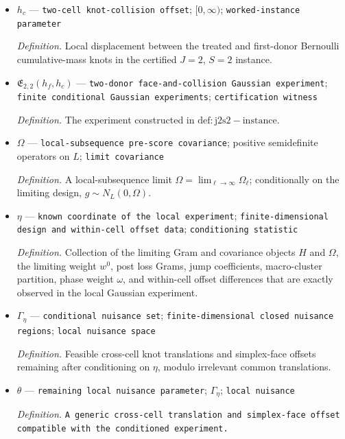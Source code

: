 \documentclass{article}
\begin{document}
\begin{itemize}
  \item \(h_c\) --- \texttt{two-\allowbreak{}cell knot-\allowbreak{}collision offset}; \([0,\infty)\); \texttt{worked-\allowbreak{}instance parameter}
  \par\smallskip\noindent\emph{Definition.} Local displacement between the treated and first-donor Bernoulli cumulative-mass knots in the certified \(J=2\), \(S=2\) instance.
  \item \(\mathfrak E_{2,2}(h_f,h_c)\) --- \texttt{two-\allowbreak{}donor face-\allowbreak{}and-\allowbreak{}collision Gaussian experiment}; \texttt{finite conditional Gaussian experiments}; \texttt{certification witness}
  \par\smallskip\noindent\emph{Definition.} The experiment constructed in \(\mathrm{def:j2s2-instance}\).
  \item \(\Omega\) --- \texttt{local-\allowbreak{}subsequence pre-\allowbreak{}score covariance}; positive semidefinite operators on \(L\); \texttt{limit covariance}
  \par\smallskip\noindent\emph{Definition.} A local-subsequence limit \(\Omega=\lim_{\ell\to\infty}\Omega_\ell\); conditionally on the limiting design, \(g\sim N_L(0,\Omega)\).
  \item \(\eta\) --- \texttt{known coordinate of the local experiment}; \texttt{finite-\allowbreak{}dimensional design and within-\allowbreak{}cell offset data}; \texttt{conditioning statistic}
  \par\smallskip\noindent\emph{Definition.} Collection of the limiting Gram and covariance objects \(H\) and \(\Omega\), the limiting weight \(w^0\), post loss Grams, jump coefficients, macro-cluster partition, phase weight \(\omega\), and within-cell offset differences that are exactly observed in the local Gaussian experiment.
  \item \(\Gamma_\eta\) --- \texttt{conditional nuisance set}; \texttt{finite-\allowbreak{}dimensional closed nuisance regions}; \texttt{local nuisance space}
  \par\smallskip\noindent\emph{Definition.} Feasible cross-cell knot translations and simplex-face offsets remaining after conditioning on \(\eta\), modulo irrelevant common translations.
  \item \(\theta\) --- \texttt{remaining local nuisance parameter}; \(\Gamma_\eta\); \texttt{local nuisance}
  \par\smallskip\noindent\emph{Definition.} \texttt{A generic cross-\allowbreak{}cell translation and simplex-\allowbreak{}face offset compatible with the conditioned experiment.}

\end{itemize}
\end{document}
